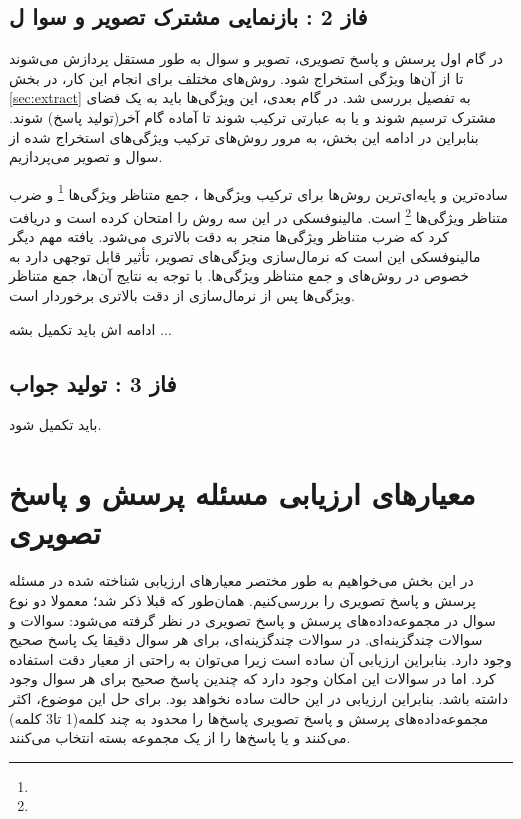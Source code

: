 		 
		 
		
	

\subsection{فاز 2 : بازنمایی مشترک تصویر و سوا ل}	
در گام اول پرسش و پاسخ تصویری، تصویر و سوال به طور مستقل پردازش می‌شوند تا از آن‌ها ویژگی استخراج شود. روش‌های مختلف برای انجام این کار، در بخش 
\ref{sec:extract}
به تفصیل بررسی شد. در گام بعدی، این ویژگی‌ها باید به یک فضای مشترک ترسیم شوند و یا به عبارتی ترکیب شوند تا آماده گام آخر(تولید پاسخ) شوند. بنابراین در ادامه این بخش، به مرور روش‌های ترکیب ویژگی‌های استخراج شده از سوال و تصویر می‌پردازیم.

ساده‌ترین و پایه‌ای‌ترین روش‌ها برای ترکیب ویژگی‌ها 
، جمع متناظر ویژگی‌ها
\footnote{}
و ضرب متناظر ویژگی‌ها
\footnote{}
 است. مالینوفسکی در
 \cite{malinowski2017ask}
 این سه روش را امتحان کرده است و دریافت کرد که  ضرب متناظر ویژگی‌ها منجر به دقت بالاتری‌ می‌شود. یافته مهم دیگر مالینوفسکی این است که نرمال‌سازی
  ویژگی‌های تصویر، تأثیر قابل توجهی دارد به خصوص در روش‌های
  و جمع متناظر ویژگی‌ها. با توجه به نتایج آن‌ها، جمع متناظر ویژگی‌ها پس از نرمال‌سازی از دقت بالاتری برخوردار است.
  
  ادامه اش باید تکمیل بشه ... 

\subsection{فاز 3 : تولید جواب}
باید تکمیل شود.

\section{معیارهای ارزیابی مسئله پرسش و پاسخ تصویری}

در این بخش می‌خواهیم به طور مختصر معیارهای ارزیابی شناخته شده در مسئله پرسش و پاسخ تصویری را بررسی‌کنیم. همان‌طور که قبلا ذکر شد؛ معمولا دو نوع سوال در مجموعه‌داده‌های پرسش و پاسخ تصویری در نظر گرفته می‌شود: سوالات 
و سوالات چندگزینه‌ای. در سوالات چندگزینه‌ای، برای هر سوال دقیقا یک پاسخ صحیح وجود دارد. بنابراین ارزیابی آن ساده است زیرا می‌توان به راحتی از معیار دقت استفاده کرد. اما در سوالات
این امکان وجود دارد که چندین پاسخ صحیح برای هر سوال وجود داشته باشد. بنابراین ارزیابی در این حالت ساده نخواهد بود. برای حل این موضوع، اکثر مجموعه‌داده‌های پرسش و پاسخ تصویری پاسخ‌ها را محدود به چند کلمه(1 تا3 کلمه) می‌کنند و یا پاسخ‌ها را از یک مجموعه بسته انتخاب می‌کنند.

